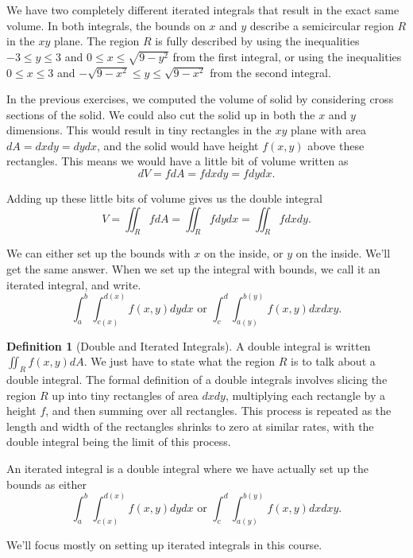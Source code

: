 \documentclass[10pt,]{book}
\theoremstyle{plain}
\theoremstyle{definition}
\newtheorem{definition}[theorem]{Definition}
\theoremstyle{definition}
\theoremstyle{definition}
\theoremstyle{definition}
\theoremstyle{definition}
\numberwithin{equation}{section}
\newcommand{\ds}{\displaystyle}
\begin{document}
%
\par
We have two completely different iterated integrals that result in the exact same volume. In both integrals, the bounds on \(x\) and \(y\) describe a semicircular region \(R\) in the \(xy\) plane. The region \(R\) is fully described by using the inequalities \(-3\leq y\leq 3\) and \(0\leq x\leq \sqrt{9-y^2}\) from the first integral, or using the inequalities \(0\leq x\leq 3\) and \(-\sqrt{9-x^2}\leq y\leq \sqrt{9-x^2}\) from the second integral.%
\par
In the previous exercises, we computed the volume of solid by considering cross sections of the solid. We could also cut the solid up in both the \(x\) and \(y\) dimensions. This would result in tiny rectangles in the \(xy\) plane with area \(dA=dxdy=dydx\), and the solid would have height \(f(x,y)\) above these rectangles. This means we would have a little bit of volume written as%
\begin{equation*}
dV=fdA=fdxdy=fdydx.
\end{equation*}
%
\par
Adding up these little bits of volume gives us the double integral%
\begin{equation*}
V = \iint_R fdA=\iint_R fdydx=\iint_R fdxdy.
\end{equation*}
%
\par
We can either set up the bounds with \(x\) on the inside, or \(y\) on the inside. We'll get the same answer. When we set up the integral with bounds, we call it an iterated integral, and write.%
\begin{equation*}
\ds \int_a^b \int_{c(x)}^{d(x)}f(x,y)dydx  \text{ or }  
\ds \int_c^d \int_{a(y)}^{b(y)}f(x,y)dxdxy.
\end{equation*}
%
\begin{definition}[{Double and Iterated Integrals}]\label{definition-40}
A double integral is written \(\ds \iint_R f(x,y)dA\). We just have to state what the region \(R\) is to talk about a double integral. The formal definition of a double integrals involves slicing the region \(R\) up into tiny rectangles of area \(dxdy\), multiplying each rectangle by a height \(f\), and then summing over all rectangles. This process is repeated as the length and width of the rectangles shrinks to zero at similar rates, with the double integral being the limit of this process.%
\par
An iterated integral is a double integral where we have actually set up the bounds as either%
\begin{equation*}
\ds \int_a^b \int_{c(x)}^{d(x)}f(x,y)dydx  \text{ or }  
\ds \int_c^d \int_{a(y)}^{b(y)}f(x,y)dxdxy.
\end{equation*}
%
\par
We'll focus mostly on setting up iterated integrals in this course.%
\end{definition}
\end{document}

